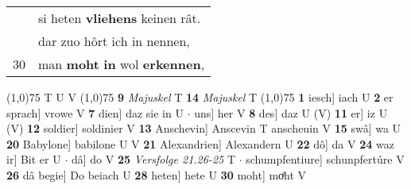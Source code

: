 \documentclass[8pt,a4paper,notitlepage]{article}
\begin{document}
\begin{table}[ht]
\begin{minipage}[t]{0.5\linewidth}
\begin{tabular}{rl}
 & si heten \textbf{vliehens} keinen rât.\\ 
 & dar zuo hôrt ich in nennen,\\ 
30 & man \textbf{moht} \textbf{in} wol \textbf{erkennen},\\ 
\end{tabular}
\scriptsize
\line(1,0){75} \newline
T U V \newline
\line(1,0){75} \newline
\textbf{9} \textit{Majuskel} T  \textbf{14} \textit{Majuskel} T  \newline
\line(1,0){75} \newline
\textbf{1} iesch] iach U \textbf{2} er sprach] vrowe V \textbf{7} dien] daz sie in U  $\cdot$ uns] her V \textbf{8} des] daz U (V) \textbf{11} er] iz U (V) \textbf{12} soldier] soldinier V \textbf{13} Anschevin] Anscevin T anscheuin V \textbf{15} swâ] wa U \textbf{20} Babylone] babilone U V \textbf{21} Alexandrien] Alexandern U \textbf{22} dô] da V \textbf{24} waz ir] Bit er U  $\cdot$ dâ] do V \textbf{25} \textit{Versfolge 21.26-25} T   $\cdot$ schumpfentiure] schunpfertúre V \textbf{26} dâ begie] Do beiach U \textbf{28} heten] hete U \textbf{30} moht] moͤht V \newline
\end{minipage}
\end{table}
\end{document}
